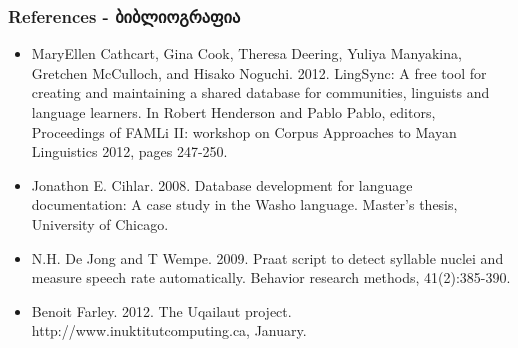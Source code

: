 \documentclass{beamer}
\begin{document}
\begin{frame}
\frametitle{References - ბიბლიოგრაფია}
\tiny
\begin{itemize}
\item MaryEllen Cathcart, Gina Cook, Theresa Deering, Yuliya Manyakina, Gretchen McCulloch, and Hisako Noguchi. 2012. LingSync: A free tool for creating and maintaining a shared database for communities, linguists and language learners. In Robert Henderson and Pablo Pablo, editors, Proceedings of FAMLi II: workshop on Corpus Approaches to Mayan Linguistics 2012, pages 247-250.
\item Jonathon E. Cihlar. 2008. Database development for language documentation: A case study in the Washo language. Master's thesis, University of Chicago.
\item N.H. De Jong and T Wempe. 2009. Praat script to detect syllable nuclei and measure speech rate automatically. Behavior research methods, 41(2):385-390.
\item Benoit Farley. 2012. The Uqailaut project. http://www.inuktitutcomputing.ca, January.

\end{itemize}
\end{frame}
\end{document}

